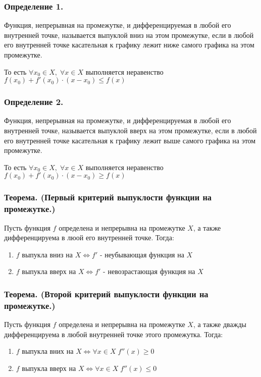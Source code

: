 \documentclass[a4paper,12pt]{article}
\theoremstyle{plain} %
\theoremstyle{definition} %
\theoremstyle{remark} %
\begin{document}
\subsubsection*{Определение 1.}
Функция, непрерывная на промежутке, и дифференцируемая в любой его внутренней точке, называется выпуклой вниз на этом промежутке, если в любой его внутренней точке касательная к графику лежит ниже самого графика на этом промежутке.

То есть $\forall x_0 \in X, \; \forall x \in X$ выполняется неравенство $f(x_0) + f'(x_0) \cdot (x - x_0) \leq f(x)$

\subsubsection*{Определение 2.}
Функция, непрерывная на промежутке, и дифференцируемая в любой его внутренней точке, называется выпуклой вверх на этом промежутке, если в любой его внутренней точке касательная к графику лежит выше самого графика на этом промежутке.

То есть $\forall x_0 \in X, \; \forall x \in X$ выполняется неравенство $f(x_0) + f'(x_0) \cdot (x - x_0) \geq f(x)$

\subsubsection*{Теорема. (Первый критерий выпуклости функции на промежутке.)}
Пусть функция $f$ определена и непрерывна на промежутке $X$, а также дифференцируема в люой его внутренней точке. Тогда:

\begin{enumerate}
	\item $f$ выпукла вниз на $X \Leftrightarrow f'$ - неубывающая функция на $X$
	\item $f$ выпукла вверх на $X \Leftrightarrow f'$ - невозрастающая функция на $X$
\end{enumerate}

\subsubsection*{Теорема. (Второй критерий выпуклости функции на промежутке.)}
Пусть функция $f$ определена и непрерывна на промежутке $X$, а также дважды дифференцируема в любой внутренней точке этого промежутка.
Тогда:

\begin{enumerate}
	\item $f$ выпукла вних на $X \Leftrightarrow \forall x \in X \;  f''(x) \geq 0$
	\item $f$ выпукла вверх на $X \Leftrightarrow \forall x \in X \; f''(x) \leq 0$
\end{enumerate}
\end{document}
